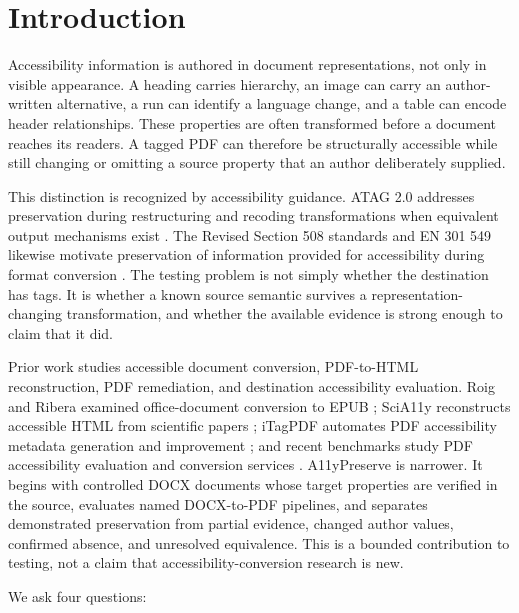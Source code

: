 \section{Introduction}
\label{sec:introduction}

Accessibility information is authored in document representations, not only in visible appearance. A heading carries hierarchy, an image can carry an author-written alternative, a run can identify a language change, and a table can encode header relationships. These properties are often transformed before a document reaches its readers. A tagged PDF can therefore be structurally accessible while still changing or omitting a source property that an author deliberately supplied.

This distinction is recognized by accessibility guidance. ATAG 2.0 addresses preservation during restructuring and recoding transformations when equivalent output mechanisms exist \cite{atag20}. The Revised Section 508 standards and EN 301 549 likewise motivate preservation of information provided for accessibility during format conversion \cite{section508,etsi301549}. The testing problem is not simply whether the destination has tags. It is whether a known source semantic survives a representation-changing transformation, and whether the available evidence is strong enough to claim that it did.

Prior work studies accessible document conversion, PDF-to-HTML reconstruction, PDF remediation, and destination accessibility evaluation. Roig and Ribera examined office-document conversion to EPUB \cite{roig2015}; SciA11y reconstructs accessible HTML from scientific papers \cite{wang2021scia11y}; iTagPDF automates PDF accessibility metadata generation and improvement \cite{mowar2026}; and recent benchmarks study PDF accessibility evaluation and conversion services \cite{kumar2025,daisy2026,docaccessible2026}. A11yPreserve is narrower. It begins with controlled DOCX documents whose target properties are verified in the source, evaluates named DOCX-to-PDF pipelines, and separates demonstrated preservation from partial evidence, changed author values, confirmed absence, and unresolved equivalence. This is a bounded contribution to testing, not a claim that accessibility-conversion research is new.

We ask four questions:

